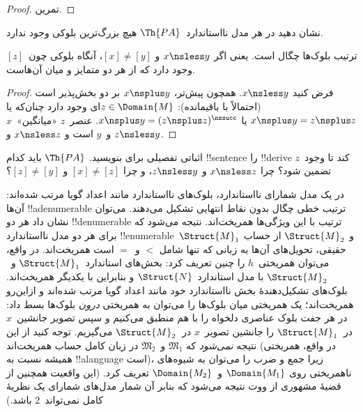 \documentclass[../../../include/open-logic-section]{subfiles}
\begin{document}
\begin{proof}
تمرین.
\end{proof}

\begin{prob}
نشان دهید در هر مدل نااستاندارد~$\Th{PA}$ هیچ بزرگ‌ترین بلوکی وجود
ندارد.
\end{prob}

\begin{prop}
ترتیب بلوک‌ها چگال است. یعنی اگر $x \nsless y$ و
$[x] \neq [y]$، آنگاه بلوکی چون~$[z]$ وجود دارد که از هر دو متمایز و
میان آن‌هاست.
\end{prop}

\begin{proof}
فرض کنید $x \nsless y$. همچون پیش‌تر، $x \nsplus y$ بر دو بخش‌پذیر
است (احتمالاً با باقیمانده): $z \in \Domain{M}$ای وجود دارد چنان‌که
یا $x \nsplus y = z \nsplus z$ یا
$x \nsplus y = (z \nsplus z)^\nssucc$. عنصر~$z$ «میانگین»~$x$
و~$y$ است و $x \nsless z$ و $z \nsless y$.
\end{proof}

\begin{prob}
اثباتی تفصیلی برای
 بنویسید. $\Th{PA}$ باید کدام
!!{sentence} را !!{derive} کند تا وجود~$z$ تضمین شود؟ چرا
$x \nsless z$ و $z \nsless y$، و چرا
$[x] \neq [z]$ و $[z] \neq [y]$؟
\end{prob}

\begin{explain}
در یک مدل شمارای نااستاندارد، بلوک‌های نااستاندارد مانند اعداد گویا
مرتب شده‌اند: آن‌ها !!a{denumerable} ترتیب خطی چگال بدون نقاط انتهایی
تشکیل می‌دهند. می‌توان نشان داد هر دو !!{denumerable} ترتیب با این
ویژگی‌ها همریخت‌اند. نتیجه می‌شود که برای هر دو مدل نااستاندارد
!!{enumerable}~$\Struct{M}_1$ و
$\Struct{M}_2$ از حساب حقیقی، تحویل‌های آن‌ها به زبانی که تنها شامل
$<$ و~$=$ است همریخت‌اند. در واقع، می‌توان همریختی~$h$ را چنین تعریف
کرد: بخش‌های استاندارد~$\Struct{M}_1$ و~$\Struct{M}_2$ با مدل
استاندارد~$\Struct{N}$ و بنابراین با یکدیگر همریخت‌اند. بلوک‌های تشکیل‌دهندهٔ
بخش نااستاندارد خود مانند اعداد گویا مرتب شده‌اند و ازاین‌رو همریخت‌اند؛
یک همریختی میان بلوک‌ها را می‌توان به همریختی
\emph{درون} بلوک‌ها بسط داد: در هر جفت بلوک عناصری دلخواه را با هم
منطبق می‌کنیم و سپس تصویر جانشین~$x$ در~$\Struct{M}_1$ را جانشین
تصویر~$x$ در~$\Struct{M}_2$ می‌گیریم. توجه کنید از این نتیجه
\emph{نمی‌شود} که $\mathfrak{M}_1$ و~$\mathfrak{M}_2$ در زبان کامل
حساب همریخت‌اند (در واقع، همریختی همیشه نسبت به !!a{language} است)،
زیرا جمع و ضرب را می‌توان به شیوه‌های ناهمریختی روی
$\Domain{M_1}$ و~$\Domain{M_2}$ تعریف کرد. (این واقعیت همچنین از
قضیهٔ مشهوری از ووت نتیجه می‌شود که بنابر آن شمار مدل‌های شمارای یک
نظریهٔ کامل نمی‌تواند~$2$ باشد.)
\end{explain}
\end{document}
